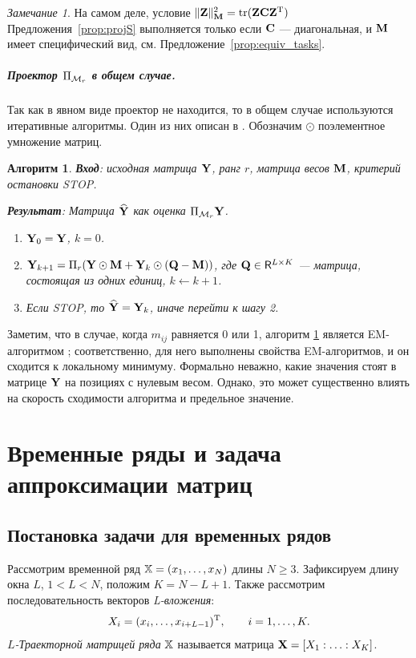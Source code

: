 \documentclass[12pt, specialist, subf,href,colorlinks=true,substylefile = spbu.rtx]{disser}
\DeclareMathOperator{\tr}{tr}
\newtheorem{algorithm}{Алгоритм}
\theoremstyle{remark}
\newtheorem{remark}{Замечание}
\theoremstyle{definition}
\begin{document}
\begin{remark}
	\label{rem:diagC}
	На самом деле, условие $\|\bfZ\|_\bfM^2 = \tr(\bfZ \bfC \bfZ^\rmT)$ Предложения~\ref{prop:projS} выполняется только если $\mathbf{C}$ --- диагональная, и $\mathbf{M}$ имеет специфический вид, см. Предложение~\ref{prop:equiv_tasks}.
\end{remark}

\paragraph{Проектор $\Pi_{\mathcal{M}_r}$ в общем случае.}
Так как в явном виде проектор не находится, то в общем случае используются итеративные алгоритмы.
Один из них описан в \cite{Srebro2003}. Обозначим $\odot$ поэлементное умножение матриц.

\begin{algorithm}
\label{alg:weightedSVD}
\textbf{Вход}: исходная матрица $\mathbf{Y}$, ранг $r$, матрица весов $\mathbf{M}$,
критерий остановки STOP.

\textbf{Результат}:
Матрица $\widehat{\mathbf{Y}}$ как оценка $\Pi_{\mathcal{M}_r} \mathbf{Y}$.

\begin{enumerate}
\item
$\mathbf{Y}_0 = \mathbf{Y}$, $k=0$.
\item
$\mathbf{Y}_{k+1} = \Pi_r(\mathbf{Y} \odot \mathbf{M} + \mathbf{Y}_{k} \odot (\mathbf{Q} -  \mathbf{M}))$, где
$\mathbf{Q} \in \mathsf{R}^{L \times K}$ --- матрица, состоящая из одних единиц, $k\leftarrow k+1$.
\item
Если STOP, то $\widehat{\mathbf{Y}} = \mathbf{Y}_k$, иначе перейти к шагу 2.
\end{enumerate}
\end{algorithm}

Заметим, что в случае, когда $m_{ij}$ равняется 0 или 1, алгоритм \ref{alg:weightedSVD} является EM-алгоритмом \cite{Srebro2003};
соответственно, для него выполнены свойства EM-алгоритмов, и он сходится к локальному минимуму.
Формально неважно, какие значения стоят в матрице $\mathbf{Y}$ на позициях с нулевым весом. Однако, это может существенно влиять на скорость сходимости алгоритма и предельное значение.

\chapter{Временные ряды и задача аппроксимации матриц}
\label{sec:ts_matrices}
\section{Постановка задачи для временных рядов}
\label{sec:ts}
Рассмотрим временной ряд $\mathbb{X} = (x_1, \ldots, x_N)$ длины $N \ge 3$. Зафиксируем длину окна $L$, $1 < L < N$, положим $K = N - L + 1$. Также рассмотрим последовательность векторов \emph{L-вложения}:
\begin{equation}\label{l_lagged}
X_i = (x_i, \ldots, x_{i + L - 1})^{\mathrm{T}}, \qquad i = 1, \ldots, K.
\end{equation}
\emph{$L$-Траекторной матрицей ряда} $\mathbb{X}$ называется матрица $\mathbf{X} = [X_1:\ldots:X_K]$.
\end{document}
